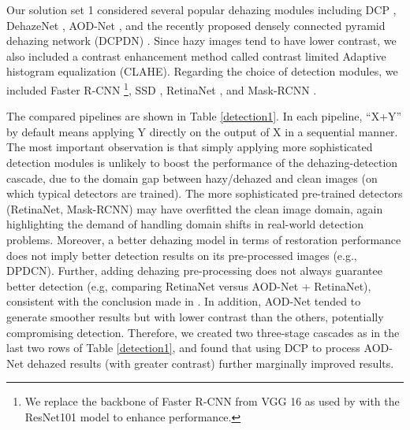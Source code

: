 \documentclass[10pt,twocolumn,letterpaper]{article}
\begin{document}
Our solution set 1 considered several popular dehazing modules including DCP \cite{he2011single}, DehazeNet \cite{cai2016dehazenet}, AOD-Net \cite{li2017aod}, and the recently proposed densely connected pyramid dehazing network (DCPDN) \cite{zhang2018densely}. Since hazy images tend to have lower contrast, we also included a contrast enhancement method called contrast limited Adaptive histogram equalization (CLAHE). Regarding the choice of detection modules, we included Faster R-CNN \cite{ren2015faster}\footnote{We replace the backbone of Faster R-CNN from VGG 16 as used by \cite{li2017reside} with the ResNet101 model \cite{he2016deep} to enhance performance.}, SSD \cite{liu2016ssd}, RetinaNet \cite{lin2017focal}, and Mask-RCNN \cite{he2017mask}. 

The compared pipelines are shown in Table \ref{detection1}. In each pipeline, ``X+Y'' by default means applying Y directly on the output of X in a sequential manner. The most important observation is that simply applying more sophisticated detection modules is unlikely to boost the performance of the dehazing-detection cascade, due to the domain gap between hazy/dehazed and clean images (on which typical detectors are trained). The more sophisticated pre-trained detectors (RetinaNet, Mask-RCNN) may have overfitted the clean image domain, again highlighting the demand of handling domain shifts in real-world detection problems. Moreover, a better dehazing model in terms of restoration performance does not imply better detection results on its pre-processed images (e.g., DPDCN). Further, adding dehazing pre-processing does not always guarantee better detection (e.g, comparing RetinaNet versus AOD-Net + RetinaNet), consistent with the conclusion made in \cite{li2017reside}. In addition, AOD-Net tended to generate smoother results but with lower contrast than the others, potentially compromising detection. Therefore, we created two three-stage cascades as in the last two rows of Table \ref{detection1}, and found that using DCP to process AOD-Net dehazed results (with greater contrast) further marginally improved results. 
\end{document}
